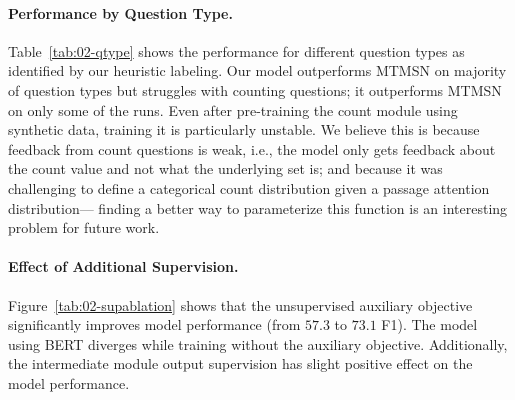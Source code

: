 \documentclass[main.tex]{subfiles}
\begin{document}
\paragraph{Performance by Question Type.} Table~\ref{tab:02-qtype} shows the performance for different question types as identified by our heuristic labeling.
Our model outperforms MTMSN on majority of question types but struggles with counting questions; it outperforms MTMSN on only some of the runs.
Even after pre-training the count module using synthetic data, training it is particularly unstable.
We believe this is because feedback from count questions is weak, i.e., the model only gets feedback about the count value and not what the underlying set is; and because it was challenging to define a categorical count distribution given a passage attention distribution---
finding a better way to parameterize this function is an interesting problem for future work.

\paragraph{Effect of Additional Supervision.}
Figure~\ref{tab:02-supablation} shows that the unsupervised auxiliary objective significantly improves model performance (from $57.3$ to $73.1$ F1). The model using BERT diverges while training without the auxiliary objective.
Additionally, the intermediate module output supervision has slight positive effect on the model performance.
\end{document}
